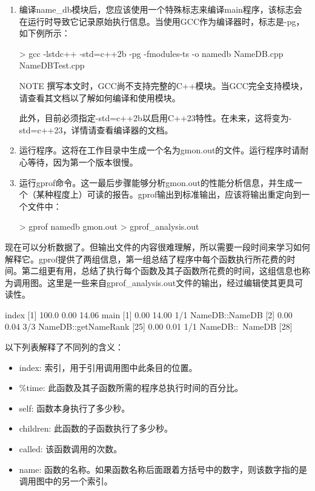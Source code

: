 \begin{enumerate}
\item
编译name\_db模块后，您应该使用一个特殊标志来编译main程序，该标志会在运行时导致它记录原始执行信息。当使用GCC作为编译器时，标志是-pg，如下例所示：

\begin{shell}
> gcc -lstdc++ -std=c++2b -pg -fmodules-ts -o namedb NameDB.cpp NameDBTest.cpp
\end{shell}

\begin{myNotic}{NOTE}
撰写本文时，GCC尚不支持完整的C++模块。当GCC完全支持模块，请查看其文档以了解如何编译和使用模块。

此外，目前必须指定-std=c++2b以启用C++23特性。在未来，这将变为-std=c++23，详情请查看编译器的文档。
\end{myNotic}

\item
运行程序。这将在工作目录中生成一个名为gmon.out的文件。运行程序时请耐心等待，因为第一个版本很慢。

\item
运行gprof命令。这一最后步骤能够分析gmon.out的性能分析信息，并生成一个（某种程度上）可读的报告。gprof输出到标准输出，应该将输出重定向到一个文件中：

\begin{shell}
> gprof namedb gmon.out > gprof_analysis.out
\end{shell}
\end{enumerate}

现在可以分析数据了。但输出文件的内容很难理解，所以需要一段时间来学习如何解释它。gprof提供了两组信息，第一组总结了程序中每个函数执行所花费的时间。第二组更有用，总结了执行每个函数及其子函数所花费的时间，这组信息也称为调用图。这里是一些来自gprof\_analysis.out文件的输出，经过编辑使其更具可读性。

\begin{shell}
index   %
[1]     100.0   0.00     14.06                main [1]
                0.00     14.00       1/1          NameDB::NameDB [2]
                0.00      0.04       3/3          NameDB::getNameRank [25]
                0.00      0.01       1/1          NameDB::~NameDB [28]
\end{shell}

以下列表解释了不同列的含义：

\begin{itemize}
\item
index: 索引，用于引用调用图中此条目的位置。

\item
\%time: 此函数及其子函数所需的程序总执行时间的百分比。

\item
self: 函数本身执行了多少秒。

\item
children: 此函数的子函数执行了多少秒。

\item
called: 该函数调用的次数。

\item
name: 函数的名称。如果函数名称后面跟着方括号中的数字，则该数字指的是调用图中的另一个索引。
\end{itemize}

